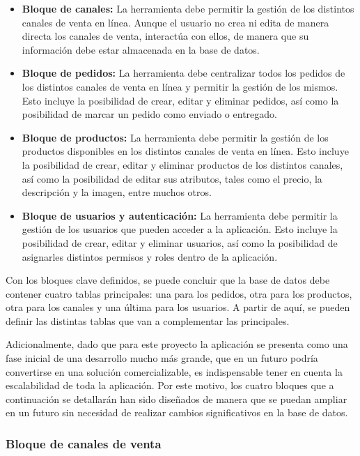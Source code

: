 \begin{itemize}
    \item \textbf{Bloque de canales:} La herramienta debe permitir la gestión de los distintos canales de venta en línea. Aunque el usuario no crea ni edita de manera directa los canales de venta, interactúa con ellos, de manera que su información debe estar almacenada en la base de datos.
    \item \textbf{Bloque de pedidos:} La herramienta debe centralizar todos los pedidos de los distintos canales de venta en línea y permitir la gestión de los mismos. Esto incluye la posibilidad de crear, editar y eliminar pedidos, así como la posibilidad de marcar un pedido como enviado o entregado.
    \item \textbf{Bloque de productos:} La herramienta debe permitir la gestión de los productos disponibles en los distintos canales de venta en línea. Esto incluye la posibilidad de crear, editar y eliminar productos de los distintos canales, así como la posibilidad de editar sus atributos, tales como el precio, la descripción y la imagen, entre muchos otros.
    \item \textbf{Bloque de usuarios y autenticación:} La herramienta debe permitir la gestión de los usuarios que pueden acceder a la aplicación. Esto incluye la posibilidad de crear, editar y eliminar usuarios, así como la posibilidad de asignarles distintos permisos y roles dentro de la aplicación.
\end{itemize}

Con los bloques clave definidos, se puede concluir que la base de datos debe contener cuatro tablas principales: una para los pedidos, otra para los productos, otra para los canales y una última para los usuarios. A partir de aquí, se pueden definir las distintas tablas que van a complementar las principales.

Adicionalmente, dado que para este proyecto la aplicación se presenta como una fase inicial de una desarrollo mucho más grande, que en un futuro podría convertirse en una solución comercializable, es indispensable tener en cuenta la escalabilidad de toda la aplicación. Por este motivo, los cuatro bloques que a continuación se detallarán han sido diseñados de manera que se puedan ampliar en un futuro sin necesidad de realizar cambios significativos en la base de datos.

\subsubsection{Bloque de canales de venta}

